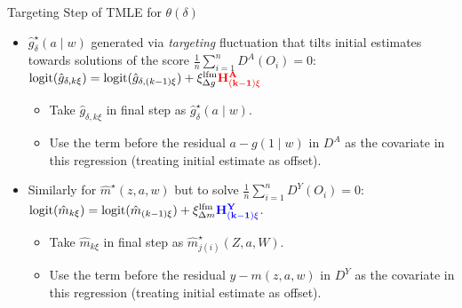 \documentclass{beamer}
\begin{document}
\begin{frame}[c]{Targeting Step of TMLE for $\theta(\delta)$}

\begin{center}
\begin{itemize}
  \itemsep8pt
  \item $\hat{g}_{\delta}^{\star}(a \mid w)$ generated via \textit{targeting}
    fluctuation that tilts initial estimates towards solutions of the score
    $\frac{1}{n}\sum_{i=1}^n D^A(O_i) = 0$:
    $\text{logit}(\hat{g}_{\delta,k\xi}) =
    \text{logit}(\hat{g}_{\delta,(k-1)\xi}) + \xi_{\Delta g}^{\text{lfm}}
    \mathbf{\textcolor{red}{H^A_{(k-1)\xi}}}$
    \begin{itemize}
      \itemsep4pt
      \item Take $\hat{g}_{\delta,k\xi}$ in final step as
        $\hat{g}_{\delta}^{\star}(a \mid w)$.
      \item Use the term before the residual $a - g(1 \mid w)$ in $D^A$ as the
        covariate in this regression (treating initial estimate as offset).
    \end{itemize}
  \item Similarly for $\hat{m}^{\star}(z,a,w)$ but to solve
    $\frac{1}{n}\sum_{i=1}^n D^Y(O_i) = 0$:
    $\text{logit}(\hat{m}_{k\xi}) = \text{logit}(\hat{m}_{(k-1)\xi}) +
    \xi_{\Delta m}^{\text{lfm}}
    \mathbf{\textcolor{blue}{H^Y_{(k-1)\xi}}}$.
    \begin{itemize}
      \itemsep4pt
      \item Take $\hat{m}_{k\xi}$ in final step as
        $\hat{m}^{\star}_{j(i)}(Z, a, W)$.
      \item Use the term before the residual $y - m(z,a,w)$ in $D^Y$ as the
        covariate in this regression (treating initial estimate as offset).
  \end{itemize}
\end{itemize}
\end{center}


\end{frame}
\end{document}
